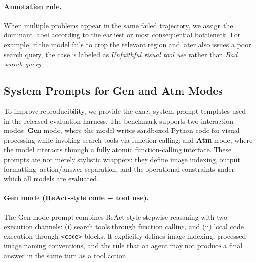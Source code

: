 \documentclass[runningheads]{llncs}
\theoremstyle{plain}
\theoremstyle{definition}
\theoremstyle{remark}
\begin{document}
\paragraph{Annotation rule.}
When multiple problems appear in the same failed trajectory, we assign the dominant label according to the earliest or most consequential bottleneck. For example, if the model fails to crop the relevant region and later also issues a poor search query, the case is labeled as \textit{Unfaithful visual tool use} rather than \textit{Bad search query}.

\subsection{System Prompts for Gen and Atm Modes}
\label{app:system_prompts}

To improve reproducibility, we provide the exact system-prompt templates used in the released evaluation harness. 
The benchmark supports two interaction modes: \textbf{Gen} mode, where the model writes sandboxed Python code for visual processing while invoking search tools via function calling; and \textbf{Atm} mode, where the model interacts through a fully atomic function-calling interface. 
These prompts are not merely stylistic wrappers: they define image indexing, output formatting, action/answer separation, and the operational constraints under which all models are evaluated.

\paragraph{Gen mode (ReAct-style code + tool use).}
The Gen-mode prompt combines ReAct-style stepwise reasoning with two execution channels: (i) search tools through function calling, and (ii) local code execution through \texttt{<code>} blocks. 
It explicitly defines image indexing, processed-image naming conventions, and the rule that an agent may not produce a final answer in the same turn as a tool action.
\end{document}
